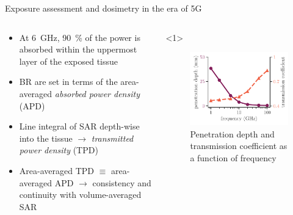 \documentclass[xcolor=dvipsnames,10pt]{beamer}
\begin{document}
\begin{frame}{Exposure assessment and dosimetry in the era of 5G}
    \begin{columns}[c]
        \begin{column}{0.5\textwidth}
             \begin{itemize}
                \item<1> At \SI{6}{\GHz}, \SI{90}{\percent} of the power is absorbed within the uppermost layer of the exposed tissue
                \item<2> BR are set in terms of the area-averaged \emph{absorbed power density} (APD)
                \item<3> Line integral of SAR depth-wise into the tissue $\rightarrow$ \emph{transmitted power density} (TPD)
                \item<4> Area-averaged TPD $\equiv$ area-averaged APD $\rightarrow$ consistency and continuity with volume-averaged SAR
            \end{itemize}
        \end{column} 
        \begin{column}{0.5\textwidth}
            \begin{onlyenv}<1>
                \begin{center}
                \begin{figure}
                    \includegraphics[width=\textwidth]{artwork/penetration_depth.pdf}
                    \caption{Penetration depth and transmission coefficient as a function of frequency}
                \end{figure}
                \end{center}

\end{onlyenv}
\end{column}
\end{columns}
\end{frame}
\end{document}
